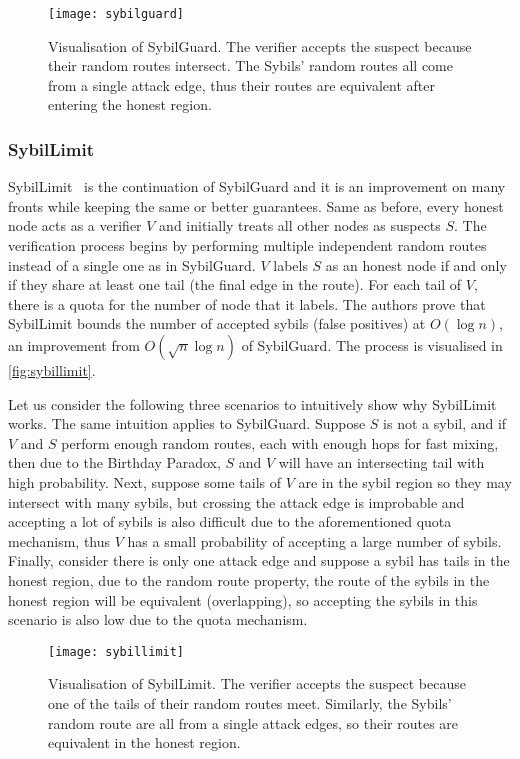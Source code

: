 \begin{figure}
  \centering
  \texttt{[image: sybilguard]}
  \caption{Visualisation of SybilGuard. The verifier accepts the suspect because
    their random routes intersect. The Sybils' random routes all come from a
    single attack edge, thus their routes are equivalent after entering the
    honest region.}
  \label{fig:sybilguard}
\end{figure}

\subsubsection{SybilLimit}
SybilLimit~\cite{yu2008sybillimit} is the continuation of SybilGuard and it is
an improvement on many fronts while keeping the same or better guarantees. Same
as before, every honest node acts as a verifier $V$ and initially treats all
other nodes as suspects $S$. The verification process begins by performing
multiple independent random routes instead of a single one as in SybilGuard. $V$
labels $S$ as an honest node if and only if they share at least one tail (the
final edge in the route). For each tail of $V$, there is a quota for the number
of node that it labels. The authors prove that SybilLimit bounds the number of
accepted sybils (false positives) at $O(\log{n})$, an improvement from
$O(\sqrt{n} \log{n})$ of SybilGuard. The process is visualised in
\autoref{fig:sybillimit}.

Let us consider the following three scenarios to intuitively show why SybilLimit
works. The same intuition applies to SybilGuard. Suppose $S$ is not a sybil, and
if $V$ and $S$ perform enough random routes, each with enough hops for fast
mixing, then due to the Birthday Paradox, $S$ and $V$ will have an intersecting
tail with high probability. Next, suppose some tails of $V$ are in the
sybil region so they may intersect with many sybils, but crossing
the attack edge is improbable and accepting a lot of sybils is also difficult
due to the aforementioned quota mechanism, thus $V$ has a small probability of
accepting a large number of sybils. Finally, consider there is only one attack
edge and suppose a sybil has tails in the honest region, due to the random route
property, the route of the sybils in the honest region will be equivalent
(overlapping), so accepting the sybils in this scenario is also low due to the
quota mechanism.

\begin{figure}
  \centering
  \texttt{[image: sybillimit]}
  \caption{Visualisation of SybilLimit. The verifier accepts the suspect because
    one of the tails of their random routes meet. Similarly, the Sybils' random
    route are all from a single attack edges, so their routes are equivalent in
    the honest region.}
  \label{fig:sybillimit}
\end{figure}

